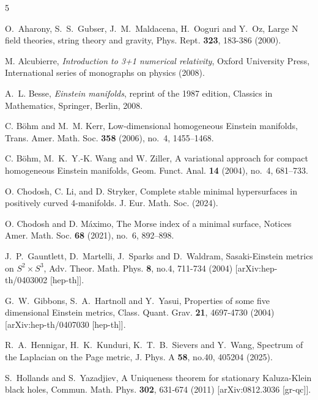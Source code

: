\documentclass[11pt]{amsart}
\theoremstyle{plain}
\theoremstyle{definition}
\numberwithin{equation}{section}
\begin{document}
\begin{thebibliography}{5}

O.~Aharony, S.~S.~Gubser, J.~M.~Maldacena, H.~Ooguri and Y.~Oz, Large N field theories, string theory and gravity,
Phys. Rept. \textbf{323}, 183-386 (2000).


 M. Alcubierre, \emph{Introduction to 3+1 numerical relativity}, Oxford University Press, International series of monographs on physics (2008).

 A.~L. Besse, {\it Einstein manifolds}, reprint of the 1987 edition, 
Classics in Mathematics, Springer, Berlin, 2008. 

 C. B\"ohm and M.~M. Kerr, Low-dimensional homogeneous Einstein manifolds, Trans. Amer. Math. Soc. {\bf 358} (2006), no.~4, 1455--1468.

 C. B\"ohm, M.~K.~Y.-K. Wang and W. Ziller, A variational approach for compact homogeneous Einstein manifolds, Geom. Funct. Anal. {\bf 14} (2004), no.~4, 681--733.

 O. Chodosh, C. Li, and D. Stryker, Complete stable minimal hypersurfaces in positively curved 4-manifolds. J. Eur. Math. Soc. (2024).


 O. Chodosh and D. M\'aximo, The Morse index of a minimal surface, Notices Amer. Math. Soc. {\bf 68} (2021), no.~6, 892--898.

J.~P.~Gauntlett, D.~Martelli, J.~Sparks and D.~Waldram, Sasaki-Einstein metrics on $S^2 \times S^3$,
Adv. Theor. Math. Phys. \textbf{8}, no.4, 711-734 (2004)
[arXiv:hep-th/0403002 [hep-th]].


G.~W.~Gibbons, S.~A.~Hartnoll and Y.~Yasui,
Properties of some five dimensional Einstein metrics,
Class. Quant. Grav. \textbf{21}, 4697-4730 (2004)
[arXiv:hep-th/0407030 [hep-th]].

R.~A.~Hennigar, H.~K.~Kunduri, K.~T.~B.~Sievers and Y.~Wang, Spectrum of the Laplacian on the Page metric,
J. Phys. A \textbf{58}, no.40, 405204 (2025).


S.~Hollands and S.~Yazadjiev,
A Uniqueness theorem for stationary Kaluza-Klein black holes,
Commun. Math. Phys. \textbf{302}, 631-674 (2011)
[arXiv:0812.3036 [gr-qc]].


\end{thebibliography}
\end{document}
